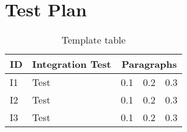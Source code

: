 
\chapter{Test Plan}
\blindtext

\begin{table}[h]
	\begin{tabularx}{\textwidth}{l | X | l l l}
		\textbf{ID} & \textbf{Integration Test} & \multicolumn{3}{c}{\textbf{Paragraphs}} \\ \hline
		I1	&	Test	&	0.1 & 0.2 & 0.3		\\	\hline
		I2	&	Test	&	0.1 & 0.2 & 0.3		\\	\hline
		I3	&	Test	&	0.1 & 0.2 & 0.3		\\
	\end{tabularx}
	\captionsetup{textformat=empty,labelformat=blank}
	\caption{Template table}
	\label{table:template-table}
\end{table}